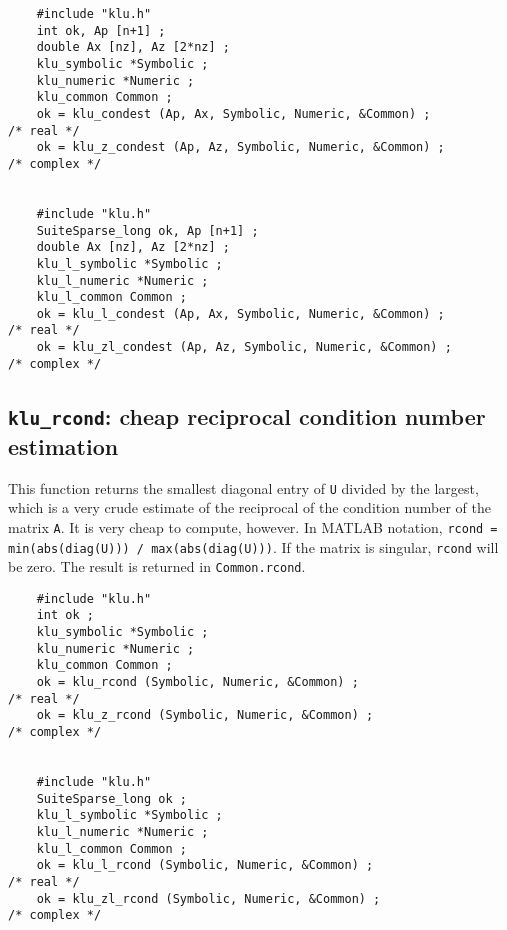\documentclass[11pt]{article}
\begin{document}
{\footnotesize
\begin{verbatim}
    #include "klu.h"
    int ok, Ap [n+1] ;
    double Ax [nz], Az [2*nz] ;
    klu_symbolic *Symbolic ;
    klu_numeric *Numeric ;
    klu_common Common ;
    ok = klu_condest (Ap, Ax, Symbolic, Numeric, &Common) ;                           /* real */
    ok = klu_z_condest (Ap, Az, Symbolic, Numeric, &Common) ;                         /* complex */


    #include "klu.h"
    SuiteSparse_long ok, Ap [n+1] ;
    double Ax [nz], Az [2*nz] ;
    klu_l_symbolic *Symbolic ;
    klu_l_numeric *Numeric ;
    klu_l_common Common ;
    ok = klu_l_condest (Ap, Ax, Symbolic, Numeric, &Common) ;                         /* real */
    ok = klu_zl_condest (Ap, Az, Symbolic, Numeric, &Common) ;                        /* complex */
\end{verbatim}
}


\subsection{{\tt klu\_rcond}: cheap reciprocal condition number estimation}

This function returns the smallest diagonal entry of {\tt U} divided by the
largest, which is a very crude estimate of the reciprocal of the condition
number of the matrix {\tt A}.  It is very cheap to compute, however.
In MATLAB notation, {\tt rcond = min(abs(diag(U))) / max(abs(diag(U)))}.
If the matrix is singular, {\tt rcond} will be zero.  The result is returned
in {\tt Common.rcond}.


{\footnotesize
\begin{verbatim}
    #include "klu.h"
    int ok ;
    klu_symbolic *Symbolic ;
    klu_numeric *Numeric ;
    klu_common Common ;
    ok = klu_rcond (Symbolic, Numeric, &Common) ;                                     /* real */
    ok = klu_z_rcond (Symbolic, Numeric, &Common) ;                                   /* complex */


    #include "klu.h"
    SuiteSparse_long ok ;
    klu_l_symbolic *Symbolic ;
    klu_l_numeric *Numeric ;
    klu_l_common Common ;
    ok = klu_l_rcond (Symbolic, Numeric, &Common) ;                                   /* real */
    ok = klu_zl_rcond (Symbolic, Numeric, &Common) ;                                  /* complex */
\end{verbatim}
}
\end{document}
